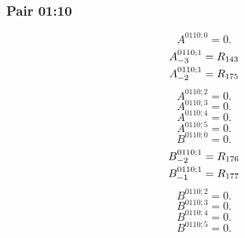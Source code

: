 \documentclass[11pt,a4paper]{article}
\begin{document}
\subsubsection{Pair 01:10}
\begin{equation}
A^{0110;0}=0.
\label{eq:cat-map-90}
\end{equation}
\begin{equation}
\shortstack[l]{$\displaystyle A^{0110;1}_{-3}=R_{143}$\\
$\displaystyle A^{0110;1}_{-2}=R_{175}$}
\label{eq:cat-map-91}
\end{equation}
\begin{equation}
A^{0110;2}=0.
\label{eq:cat-map-92}
\end{equation}
\begin{equation}
A^{0110;3}=0.
\label{eq:cat-map-93}
\end{equation}
\begin{equation}
A^{0110;4}=0.
\label{eq:cat-map-94}
\end{equation}
\begin{equation}
A^{0110;5}=0.
\label{eq:cat-map-95}
\end{equation}
\begin{equation}
B^{0110;0}=0.
\label{eq:cat-map-96}
\end{equation}
\begin{equation}
\shortstack[l]{$\displaystyle B^{0110;1}_{-2}=R_{176}$\\
$\displaystyle B^{0110;1}_{-1}=R_{177}$}
\label{eq:cat-map-97}
\end{equation}
\begin{equation}
B^{0110;2}=0.
\label{eq:cat-map-98}
\end{equation}
\begin{equation}
B^{0110;3}=0.
\label{eq:cat-map-99}
\end{equation}
\begin{equation}
B^{0110;4}=0.
\label{eq:cat-map-100}
\end{equation}
\begin{equation}
B^{0110;5}=0.
\label{eq:cat-map-101}
\end{equation}
\end{document}

